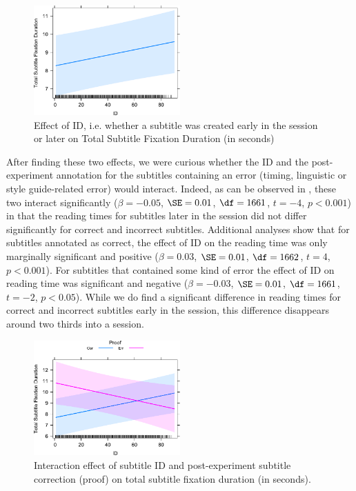 \documentclass[output=paper]{langscibook}
\begin{document}
\begin{figure}
\includegraphics[width=0.5\textwidth]{figures/LME4_TotalFixDur_ID.pdf}
%
\caption{Effect of ID, i.e.
whether a subtitle was created early in the session or later on Total Subtitle Fixation Duration (in seconds)\label{fig:6_LME4}}
\end{figure} 
 
After finding these two effects, we were curious whether the ID and the post-experiment annotation for the subtitles containing an error (timing, linguistic or style guide-related error) would interact.
Indeed, as can be observed in , these two interact significantly ($\beta=-0.05$, $\SE=0.01$, $\df=1661$, $t=-4$, $p<0.001$) in that the reading times for subtitles later in the session did not differ significantly for correct and incorrect subtitles.
Additional analyses show that for subtitles annotated as correct, the effect of ID on the reading time was only marginally significant and positive ($\beta=0.03$, $\SE=0.01$, $\df=1662$, $t=4$, $p<0.001$).
For subtitles that contained some kind of error the effect of ID on reading time was significant and negative ($\beta=-0.03$, $\SE=0.01$, $\df=1661$, $t=-2$, $p<0.05$).
While we do find a significant difference in reading times for correct and incorrect subtitles early in the session, this difference disappears around two thirds into a session.

\begin{figure}
\includegraphics[width=0.5\textwidth]{figures/LME5_TotalFixDur_ID-Proof.pdf}
%
\caption{Interaction effect of subtitle ID and post-experiment subtitle correction (proof) on total subtitle fixation duration (in seconds).\label{fig:7_LME5}}
\end{figure} 
\end{document}
